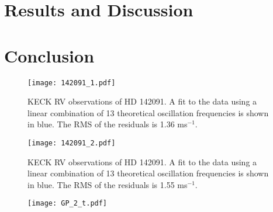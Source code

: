 \documentclass[useAMS, usenatbib]{aastex}
\begin{document}
\section{Results and Discussion}
\label{results}

\section{Conclusion}
\label{conclusion}

\begin{figure*}
\begin{center}
\texttt{[image: 142091\_1.pdf]}
\caption{KECK RV observations of HD 142091. A fit to the data using a linear
combination of 13 theoretical oscillation frequencies is shown in blue. The RMS
of the residuals is 1.36 ms$^{-1}$.}
\label{fig:k2_1}
\end{center}
\end{figure*}

\begin{figure*}
\begin{center}
\texttt{[image: 142091\_2.pdf]}
\caption{KECK RV observations of HD 142091. A fit to the data using a linear
combination of 13 theoretical oscillation frequencies is shown in blue. The RMS
of the residuals is 1.55 ms$^{-1}$.}
\label{fig:k2_2}
\end{center}
\end{figure*}

\begin{figure*}
\begin{center}
\texttt{[image: GP\_2\_t.pdf]}
\caption{
}
\label{fig:obs}
\end{center}
\end{figure*}



\end{document}
